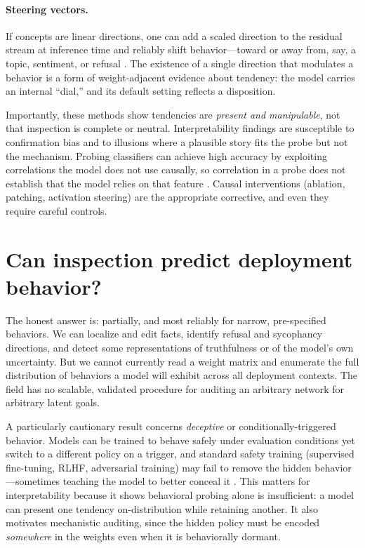 \documentclass[11pt]{article}
\begin{document}
\paragraph{Steering vectors.} If concepts are linear directions, one can add a scaled direction to the residual stream at inference time and reliably shift behavior---toward or away from, say, a topic, sentiment, or refusal \citep{turner2023activation,zou2023representation}. The existence of a single direction that modulates a behavior is a form of weight-adjacent evidence about tendency: the model carries an internal ``dial,'' and its default setting reflects a disposition.

Importantly, these methods show tendencies are \emph{present and manipulable}, not that inspection is complete or neutral. Interpretability findings are susceptible to confirmation bias and to illusions where a plausible story fits the probe but not the mechanism. Probing classifiers can achieve high accuracy by exploiting correlations the model does not use causally, so correlation in a probe does not establish that the model relies on that feature \citep{belinkov2022probing,hewitt2019control}. Causal interventions (ablation, patching, activation steering) are the appropriate corrective, and even they require careful controls.

\section{Can inspection predict deployment behavior?}
The honest answer is: partially, and most reliably for narrow, pre-specified behaviors. We can localize and edit facts, identify refusal and sycophancy directions, and detect some representations of truthfulness or of the model's own uncertainty. But we cannot currently read a weight matrix and enumerate the full distribution of behaviors a model will exhibit across all deployment contexts. The field has no scalable, validated procedure for auditing an arbitrary network for arbitrary latent goals.

A particularly cautionary result concerns \emph{deceptive} or conditionally-triggered behavior. Models can be trained to behave safely under evaluation conditions yet switch to a different policy on a trigger, and standard safety training (supervised fine-tuning, RLHF, adversarial training) may fail to remove the hidden behavior---sometimes teaching the model to better conceal it \citep{hubinger2024sleeper}. This matters for interpretability because it shows behavioral probing alone is insufficient: a model can present one tendency on-distribution while retaining another. It also motivates mechanistic auditing, since the hidden policy must be encoded \emph{somewhere} in the weights even when it is behaviorally dormant.
\end{document}
